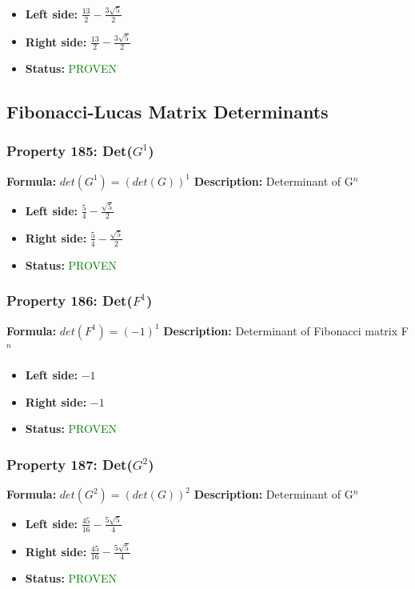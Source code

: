 \begin{itemize}
\item \textbf{Left side:} $\frac{13}{2} - \frac{3 \sqrt{5}}{2}$
\item \textbf{Right side:} $\frac{13}{2} - \frac{3 \sqrt{5}}{2}$
\item \textbf{Status:} \textcolor{green}{PROVEN}
\end{itemize}


\subsection{Fibonacci-Lucas Matrix Determinants}

\subsubsection*{Property 185: Det($G^{1}$)}
\textbf{Formula:} $det(G^1) = (det(G))^1$
\textbf{Description:} Determinant of G$^n$

\begin{itemize}
\item \textbf{Left side:} $\frac{5}{4} - \frac{\sqrt{5}}{2}$
\item \textbf{Right side:} $\frac{5}{4} - \frac{\sqrt{5}}{2}$
\item \textbf{Status:} \textcolor{green}{PROVEN}
\end{itemize}

\subsubsection*{Property 186: Det($F^{1}$)}
\textbf{Formula:} $det(F^1) = (-1)^1$
\textbf{Description:} Determinant of Fibonacci matrix F$^n$

\begin{itemize}
\item \textbf{Left side:} $-1$
\item \textbf{Right side:} $-1$
\item \textbf{Status:} \textcolor{green}{PROVEN}
\end{itemize}

\subsubsection*{Property 187: Det($G^{2}$)}
\textbf{Formula:} $det(G^2) = (det(G))^2$
\textbf{Description:} Determinant of G$^n$

\begin{itemize}
\item \textbf{Left side:} $\frac{45}{16} - \frac{5 \sqrt{5}}{4}$
\item \textbf{Right side:} $\frac{45}{16} - \frac{5 \sqrt{5}}{4}$
\item \textbf{Status:} \textcolor{green}{PROVEN}
\end{itemize}

